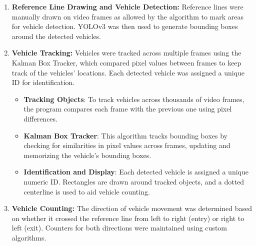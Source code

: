 {\begin{enumerate}
\begin{itemize}
    \item \textbf{Video File Settings}: Configure the video file name and its location for vehicle detection. Ensure the video is in \texttt{.mp4} format.
    \item \textbf{Prepare Video}: Convert the video files to \texttt{.mp4} if necessary and merge multiple video files if needed, as the program processes only one file at a time.
    \item \textbf{Upload Video}: Drag and drop the \texttt{.mp4} video into the input section. Enter the video name (excluding the \texttt{.mp4} extension) into the program.
    \item \textbf{Check and Process}: Run the program to verify the input files and settings. Once verified, the vehicle detection process can begin.
\end{itemize}
  \item \textbf{Reference Line Drawing and Vehicle Detection:} Reference lines were manually drawn on video frames as allowed by the algorithm to mark areas for vehicle detection. YOLOv3 was then used to generate bounding boxes around the detected vehicles.
  \item \textbf{Vehicle Tracking:} Vehicles were tracked across multiple frames using the Kalman Box Tracker, which compared pixel values between frames to keep track of the vehicles' locations. Each detected vehicle was assigned a unique ID for identification.
  \begin{itemize}
    \item \textbf{Tracking Objects}: To track vehicles across thousands of video frames, the program compares each frame with the previous one using pixel differences.
    \item \textbf{Kalman Box Tracker}: This algorithm tracks bounding boxes by checking for similarities in pixel values across frames, updating and memorizing the vehicle’s bounding boxes.
    \item \textbf{Identification and Display}: Each detected vehicle is assigned a unique numeric ID. Rectangles are drawn around tracked objects, and a dotted centerline is used to aid vehicle counting.
\end{itemize}
  \item \textbf{Vehicle Counting:} The direction of vehicle movement was determined based on whether it crossed the reference line from left to right (entry) or right to left (exit). Counters for both directions were maintained using custom algorithms.
\begin{itemize}

\end{itemize}
\end{enumerate}}
